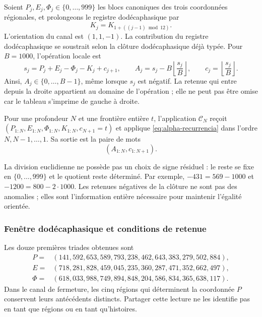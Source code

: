 Soient \(P_j,E_j,\Phi_j\in\{0,\ldots,999\}\) les blocs canoniques des
trois coordonnées régionales, et prolongeons le registre dodécaphasique par
\[
 K_j=K_{1+((j-1)\bmod12)}.
\]
L’orientation du canal est \((1,1,-1)\). La contribution du registre dodécaphasique se
soustrait selon la clôture dodécaphasique déjà typée. Pour \(B=1000\),
l’opération locale est
\begin{equation}
 s_j=P_j+E_j-\Phi_j-K_j+c_{j+1},\qquad
 A_j=s_j-B\left\lfloor\frac{s_j}{B}\right\rfloor,
 \qquad c_j=\left\lfloor\frac{s_j}{B}\right\rfloor.
 \label{eq:alpha-recurrencia}
\end{equation}
Ainsi, \(A_j\in\{0,\ldots,B-1\}\), même lorsque \(s_j\) est
négatif. La retenue qui entre depuis la droite appartient au domaine de
l'opération ; elle ne peut pas être omise car le tableau s'imprime de gauche
à droite.

\begin{definition}
\label{def:alpha-finita}
Pour une profondeur \(N\) et une frontière entière \(t\), l'application
\(\mathcal C_N\) reçoit
\((P_{1:N},E_{1:N},\Phi_{1:N},K_{1:N},c_{N+1}=t)\) et applique
\eqref{eq:alpha-recurrencia} dans l'ordre \(N,N-1,\ldots,1\). Sa sortie
est la paire de mots
\[
 (A_{1:N},c_{1:N+1}).
\]
\end{definition}

La division euclidienne ne possède pas un choix de signe résiduel : le reste se
fixe en \(\{0,\ldots,999\}\) et le quotient reste déterminé. Par
exemple, \(-431=569-1000\) et \(-1200=800-2\cdot1000\). Les
retenues négatives de la clôture ne sont pas des anomalies ; elles sont l'information
entière nécessaire pour maintenir l'égalité orientée.

\subsubsection{Fenêtre dodécaphasique et conditions de retenue}
\label{subsec:alpha-ventana}

Les douze premières triades obtenues sont
\begin{align*}
 P={}&(141,592,653,589,793,238,462,643,383,279,502,884),\\
 E={}&(718,281,828,459,045,235,360,287,471,352,662,497),\\
 \Phi={}&(618,033,988,749,894,848,204,586,834,365,638,117).
\end{align*}
Dans le canal de fermeture, les cinq régions qui déterminent la coordonnée \(P\) conservent leurs antécédents distincts. Partager cette lecture ne les identifie pas en tant que régions ou en tant qu'histoires.

